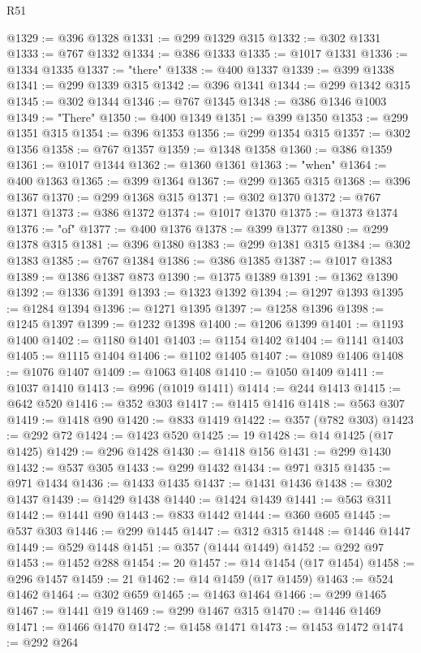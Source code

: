 \begin{lexlean}{R51}
\begin{coremodule}
@1329 := @396 @1328
@1331 := @299 @1329 @315
@1332 := @302 @1331
@1333 := @767 @1332
@1334 := @386 @1333
@1335 := @1017 @1331
@1336 := @1334 @1335
@1337 := "there"
@1338 := @400 @1337
@1339 := @399 @1338
@1341 := @299 @1339 @315
@1342 := @396 @1341
@1344 := @299 @1342 @315
@1345 := @302 @1344
@1346 := @767 @1345
@1348 := @386 @1346 @1003
@1349 := "There"
@1350 := @400 @1349
@1351 := @399 @1350
@1353 := @299 @1351 @315
@1354 := @396 @1353
@1356 := @299 @1354 @315
@1357 := @302 @1356
@1358 := @767 @1357
@1359 := @1348 @1358
@1360 := @386 @1359
@1361 := @1017 @1344
@1362 := @1360 @1361
@1363 := "when"
@1364 := @400 @1363
@1365 := @399 @1364
@1367 := @299 @1365 @315
@1368 := @396 @1367
@1370 := @299 @1368 @315
@1371 := @302 @1370
@1372 := @767 @1371
@1373 := @386 @1372
@1374 := @1017 @1370
@1375 := @1373 @1374
@1376 := "of"
@1377 := @400 @1376
@1378 := @399 @1377
@1380 := @299 @1378 @315
@1381 := @396 @1380
@1383 := @299 @1381 @315
@1384 := @302 @1383
@1385 := @767 @1384
@1386 := @386 @1385
@1387 := @1017 @1383
@1389 := @1386 @1387 @873
@1390 := @1375 @1389
@1391 := @1362 @1390
@1392 := @1336 @1391
@1393 := @1323 @1392
@1394 := @1297 @1393
@1395 := @1284 @1394
@1396 := @1271 @1395
@1397 := @1258 @1396
@1398 := @1245 @1397
@1399 := @1232 @1398
@1400 := @1206 @1399
@1401 := @1193 @1400
@1402 := @1180 @1401
@1403 := @1154 @1402
@1404 := @1141 @1403
@1405 := @1115 @1404
@1406 := @1102 @1405
@1407 := @1089 @1406
@1408 := @1076 @1407
@1409 := @1063 @1408
@1410 := @1050 @1409
@1411 := @1037 @1410
@1413 := @996 (@1019 @1411)
@1414 := @244 @1413
@1415 := @642 @520
@1416 := @352 @303
@1417 := @1415 @1416
@1418 := @563 @307
@1419 := @1418 @90
@1420 := @833 @1419
@1422 := @357 (@782 @303)
@1423 := @292 @72
@1424 := @1423 @520
@1425 := 19
@1428 := @14 @1425 (@17 @1425)
@1429 := @296 @1428
@1430 := @1418 @156
@1431 := @299 @1430
@1432 := @537 @305
@1433 := @299 @1432
@1434 := @971 @315
@1435 := @971 @1434
@1436 := @1433 @1435
@1437 := @1431 @1436
@1438 := @302 @1437
@1439 := @1429 @1438
@1440 := @1424 @1439
@1441 := @563 @311
@1442 := @1441 @90
@1443 := @833 @1442
@1444 := @360 @605
@1445 := @537 @303
@1446 := @299 @1445
@1447 := @312 @315
@1448 := @1446 @1447
@1449 := @529 @1448
@1451 := @357 (@1444 @1449)
@1452 := @292 @97
@1453 := @1452 @288
@1454 := 20
@1457 := @14 @1454 (@17 @1454)
@1458 := @296 @1457
@1459 := 21
@1462 := @14 @1459 (@17 @1459)
@1463 := @524 @1462
@1464 := @302 @659
@1465 := @1463 @1464
@1466 := @299 @1465
@1467 := @1441 @19
@1469 := @299 @1467 @315
@1470 := @1446 @1469
@1471 := @1466 @1470
@1472 := @1458 @1471
@1473 := @1453 @1472
@1474 := @292 @264

\end{coremodule}
\end{lexlean}
